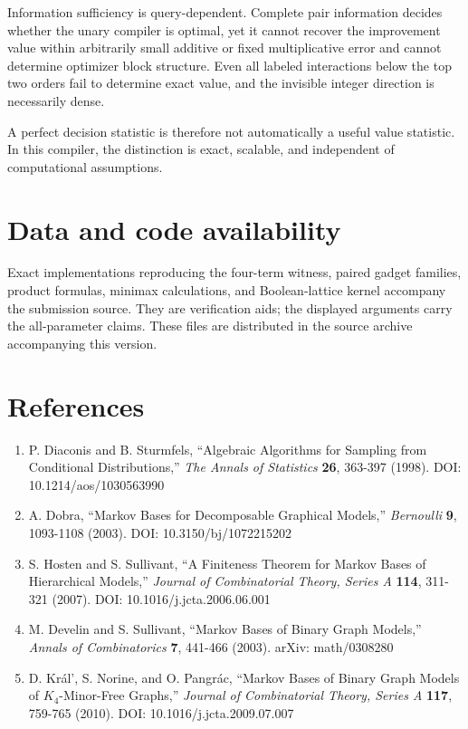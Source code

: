 \documentclass[
  11pt,
]{article}
\providecommand{\tightlist}{%
  \setlength{\itemsep}{0pt}\setlength{\parskip}{0pt}}
\begin{document}
Information sufficiency is query-dependent. Complete pair information
decides whether the unary compiler is optimal, yet it cannot recover the
improvement value within arbitrarily small additive or fixed
multiplicative error and cannot determine optimizer block structure.
Even all labeled interactions below the top two orders fail to determine
exact value, and the invisible integer direction is necessarily dense.

A perfect decision statistic is therefore not automatically a useful
value statistic. In this compiler, the distinction is exact, scalable,
and independent of computational assumptions.

\hypertarget{data-and-code-availability}{%
\section{Data and code availability}\label{data-and-code-availability}}

Exact implementations reproducing the four-term witness, paired gadget
families, product formulas, minimax calculations, and Boolean-lattice
kernel accompany the submission source. They are verification aids; the
displayed arguments carry the all-parameter claims. These files are
distributed in the source archive accompanying this version.

\hypertarget{references}{%
\section{References}\label{references}}

\begin{enumerate}
\def\labelenumi{\arabic{enumi}.}
\tightlist
\item
  P. Diaconis and B. Sturmfels, ``Algebraic Algorithms for Sampling from
  Conditional Distributions,'' \emph{The Annals of Statistics}
  \textbf{26}, 363-397 (1998). DOI: 10.1214/aos/1030563990
\item
  A. Dobra, ``Markov Bases for Decomposable Graphical Models,''
  \emph{Bernoulli} \textbf{9}, 1093-1108 (2003). DOI:
  10.3150/bj/1072215202
\item
  S. Hosten and S. Sullivant, ``A Finiteness Theorem for Markov Bases of
  Hierarchical Models,'' \emph{Journal of Combinatorial Theory, Series
  A} \textbf{114}, 311-321 (2007). DOI: 10.1016/j.jcta.2006.06.001
\item
  M. Develin and S. Sullivant, ``Markov Bases of Binary Graph Models,''
  \emph{Annals of Combinatorics} \textbf{7}, 441-466 (2003). arXiv:
  math/0308280
\item
  D. Král', S. Norine, and O. Pangrác, ``Markov Bases of Binary Graph
  Models of \(K_4\)-Minor-Free Graphs,'' \emph{Journal of Combinatorial
  Theory, Series A} \textbf{117}, 759-765 (2010). DOI:
  10.1016/j.jcta.2009.07.007
\end{enumerate}
\end{document}
